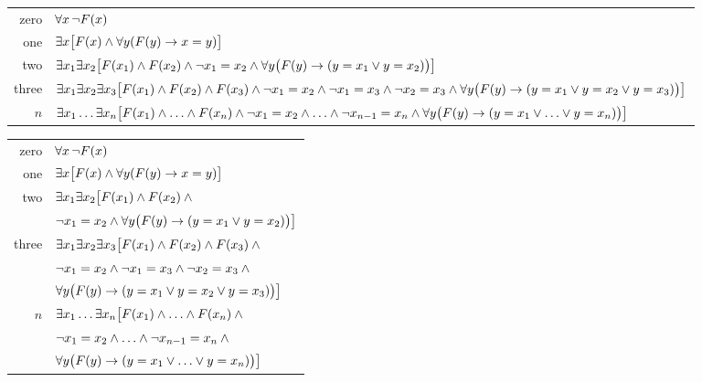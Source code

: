 \noindent
\ifHTMLtarget
\begin{tabular*}{\textwidth}{rl}
	zero & $\forall x\,\neg \mathord{F}(x)$\\
	one & $\exists x\bigl[\mathord{F}(x) \wedge \forall y(\mathord{F}(y) \rightarrow x = y)\bigr]$\\
	two & $\exists x_1\exists x_2\bigl[\mathord{F}(x_1) \wedge \mathord{F}(x_2) \wedge \neg x_1 = x_2 \wedge \forall y\bigl(\mathord{F}(y) \rightarrow (y= x_1 \vee y = x_2)\bigr) \bigr]$\\
	three & $\exists x_1\exists x_2\exists x_3\bigl[\mathord{F}(x_1) \wedge \mathord{F}(x_2) \wedge \mathord{F}(x_3) \wedge \neg x_1 =  x_2 \wedge \neg  x_1 = x_3 \wedge \neg x_2 = x_3 \wedge \forall y\bigl(\mathord{F}(y) \rightarrow (y = x_1 \vee y = x_2 \vee y =  x_3)\bigr) \bigr]$\\
	$n$ & $\exists x_1\ldots\exists x_n\bigl[\mathord{F}(x_1) \wedge\ldots\wedge \mathord{F}(x_n)  \wedge \neg x_1 = x_2 \wedge\ldots\wedge \neg x_{n-1}= x_n \wedge \forall y\bigl(\mathord{F}(y) \rightarrow (y= x_1 \vee \ldots \vee y= x_n)\bigr)\bigr]$ 
\end{tabular*}
\else
\begin{tabular*}{\textwidth}{rl}
	zero & $\forall x\,\neg \mathord{F}(x)$\\
	one & $\exists x\bigl[\mathord{F}(x) \wedge \forall y(\mathord{F}(y) \rightarrow x = y)\bigr]$\\
	two & $\exists x_1\exists x_2\bigl[\mathord{F}(x_1) \wedge \mathord{F}(x_2) \wedge {}$\\
	& \quad$\neg x_1 = x_2 \wedge \forall y\bigl(\mathord{F}(y) \rightarrow (y= x_1 \vee y = x_2)\bigr) \bigr]$\\
	three & $\exists x_1\exists x_2\exists x_3\bigl[\mathord{F}(x_1) \wedge \mathord{F}(x_2) \wedge \mathord{F}(x_3) \wedge {}$\\
	& \quad$\neg x_1 =  x_2 \wedge \neg  x_1 = x_3 \wedge \neg x_2 = x_3 \wedge {}$\\
	& \qquad$\forall y\bigl(\mathord{F}(y) \rightarrow (y = x_1 \vee y = x_2 \vee y =  x_3)\bigr) \bigr]$\\
	$n$ & $\exists x_1\ldots\exists x_n\bigl[\mathord{F}(x_1) \wedge\ldots\wedge \mathord{F}(x_n)  \wedge {}$\\
	& \quad$\neg x_1 = x_2 \wedge\ldots\wedge \neg x_{n-1}= x_n \wedge {}$\\
	& \qquad$\forall y\bigl(\mathord{F}(y) \rightarrow (y= x_1 \vee \ldots \vee y= x_n)\bigr)\bigr]$ 
\end{tabular*}
\fi



